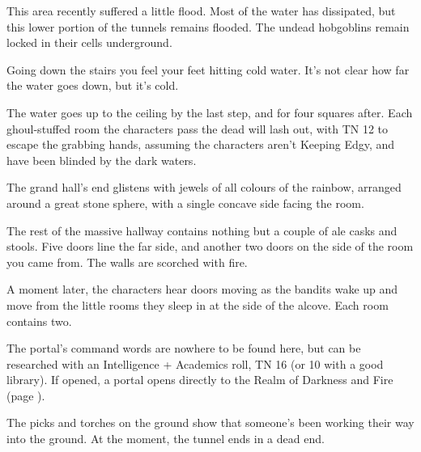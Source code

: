 \begin{multicols}{2}

This area recently suffered a little flood.  Most of the water has dissipated, but this lower portion of the tunnels remains flooded.  The undead hobgoblins remain locked in their cells underground.


\begin{boxtext}
	Going down the stairs you feel your feet hitting cold water.  It's not clear how far the water goes down, but it's cold.
\end{boxtext}

The water goes up to the ceiling by the last step, and for four squares after.  Each ghoul-stuffed room the characters pass the dead will lash out, with TN 12 to escape the grabbing hands, assuming the characters aren't Keeping Edgy, and have been blinded by the dark waters.



\begin{boxtext}
	The grand hall's end glistens with jewels of all colours of the rainbow, arranged around a great stone sphere, with a single concave side facing the room.

	The rest of the massive hallway contains nothing but a couple of ale casks and stools.  Five doors line the far side, and another two doors on the side of the room you came from.  The walls are scorched with fire.

\end{boxtext}

A moment later, the characters hear doors moving as the bandits wake up and move from the little rooms they sleep in at the side of the alcove.  Each room contains two.

The portal's command words are nowhere to be found here, but can be researched with an Intelligence + Academics roll, TN 16 (or 10 with a good library).  If opened, a portal opens directly to the Realm of Darkness and Fire (page \pageref{darknessandfire}).






\begin{boxtext}
	The picks and torches on the ground show that someone's been working their way into the ground.  At the moment, the tunnel ends in a dead end.
\end{boxtext}
 

\end{multicols}

